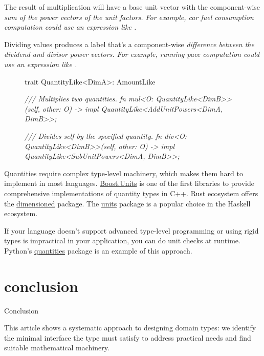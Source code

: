\documentclass{article}
\begin{document}
The result of multiplication will have a base unit vector with the component-wise \em{sum} of the power vectors of the unit factors.
For example, car fuel consumption computation could use an expression like .

Dividing values produces a label that's a component-wise \em{difference} between the dividend and divisor power vectors.
For example, running pace computation could use an expression like .

\begin{figure}
\begin{code}
trait QuantityLike<DimA>: AmountLike {
  \em{/// Multiplies two quantities.}
  fn mul<O: QuantityLike<DimB>>(self, other: O)
    -> impl QuantityLike<AddUnitPowers<DimA, DimB>>;

  \em{/// Divides self by the specified quantity.}
  fn div<O: QuantityLike<DimB>>(self, other: O)
    -> impl QuantityLike<SubUnitPowers<DimA, DimB>>;
}
\end{code}
\end{figure}

Quantities require complex type-level machinery, which makes them hard to implement in most languages.
\href{https://www.boost.org/doc/libs/1_65_0/doc/html/boost_units.html}{Boost.Units} is one of the first libraries to provide comprehensive implementations of quantity types in C++.
Rust ecosystem offers the \href{https://crates.io/crates/dimensioned}{dimensioned} package.
The \href{https://hackage.haskell.org/package/units}{units} package is a popular choice in the Haskell ecosystem.

If your language doesn't support advanced type-level programming or using rigid types is impractical in your application, you can do unit checks at runtime.
Python's \href{https://github.com/python-quantities/python-quantities}{quantities} package is an example of this approach.

\section{conclusion}{Conclusion}

This article shows a systematic approach to designing domain types: we identify the minimal interface the type must satisfy to address practical needs and find suitable mathematical machinery.
\end{document}
